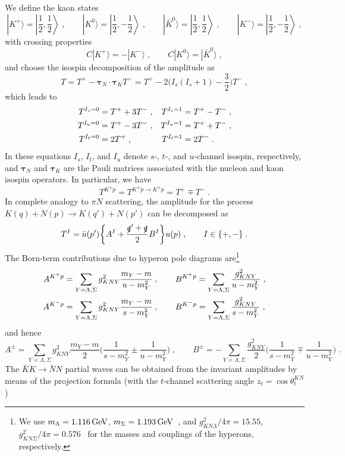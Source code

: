 \documentclass[11pt]{article}%
\providecommand{\ec}{\;,}
\providecommand{\ep}{\;.}
\providecommand{\nt}{\notag}
\newcommand{\beq}{\begin{equation}}
\newcommand{\eeq}{\end{equation}}
\begin{document}
We define the kaon states
\beq
|K^+\rangle=\left|\frac{1}{2},\frac{1}{2}\right\rangle\ec\qquad |K^0\rangle=\left|\frac{1}{2},-\frac{1}{2}\right\rangle\ec \qquad 
|\bar K^0\rangle=\left|\frac{1}{2},\frac{1}{2}\right\rangle\ec\qquad |K^-\rangle=\left|\frac{1}{2},-\frac{1}{2}\right\rangle\ec
\eeq
with crossing properties
\beq
C|K^+\rangle=-|K^-\rangle\ec \qquad C|K^0\rangle=|\bar K^0\rangle\ec
\eeq
and choose the isospin decomposition of the amplitude as
\beq
T=T^+-\boldsymbol{\tau}_N\cdot \boldsymbol{\tau}_K T^-=T^+-2\Big(I_s(I_s+1)-\frac{3}{2}\Big)T^-\ec
\eeq
which leads to
\begin{align}
\label{cJKN}
T^{I_s=0}&=T^++3T^-\ec &T^{I_s=1}&=T^+-T^-\ec\nt\\
T^{I_u=0}&=T^+-3T^-\ec &T^{I_u=1}&=T^++T^-\ec\nt\\
T^{I_t=0}&=2T^+\ec &T^{I_t=1}&=2T^-\ep 
\end{align}
In these equations $I_s$, $I_t$, and $I_u$ denote $s$-, $t$-, and $u$-channel isospin, respectively, and $\boldsymbol{\tau}_N$ and $\boldsymbol{\tau}_K$ are the Pauli matrices associated with the nucleon and kaon isospin operators.
In particular, we have
\beq
T^{K^\pm p}=T^{K^\pm p\to K^\pm p}=T^+\mp T^-\ep
\eeq
In complete analogy to $\pi N$ scattering, the amplitude for the process $K(q)+N(p)\to K(q')+N(p')$ can be decomposed as
\beq
T^I=\bar u (p')\bigg\{A^I+\frac{\slashed q'+\slashed q}{2}B^I\bigg\} u(p)\ec\qquad I\in\{+,-\} \ep
\eeq
The Born-term contributions due to hyperon pole diagrams are\footnote{We use $m_\Lambda=1.116\,{\rm GeV}$, $m_\Sigma=1.193\,{\rm GeV}$~\cite{PDG}, and $g_{KN\Lambda}^2/4\pi=15.55$, $g_{KN\Sigma}^2/4\pi=0.576$~\cite{Speth89} for the masses and couplings of the hyperons, respectively.} 
\begin{align}
A^{K^+p}&=\sum_{Y={\Lambda,\Sigma}}g_{KNY}^2\frac{m_Y-m}{u-m_Y^2}\ec\qquad B^{K^+p}=\sum_{Y={\Lambda,\Sigma}}\frac{g_{KNY}^2}{u-m_Y^2}\ec\nt\\
A^{K^-p}&=\sum_{Y={\Lambda,\Sigma}}g_{KNY}^2\frac{m_Y-m}{s-m_Y^2}\ec\qquad B^{K^-p}=\sum_{Y={\Lambda,\Sigma}}\frac{g_{KNY}^2}{s-m_Y^2}\ec
\end{align}
and hence
\beq
 A^{\pm}=\sum_{Y={\Lambda,\Sigma}}g_{KNY}^2\frac{m_Y-m}{2}\bigg(\frac{1}{s-m_Y^2}\pm\frac{1}{u-m_Y^2}\bigg)\ec\qquad
B^{\pm}=-\sum_{Y={\Lambda,\Sigma}}\frac{g_{KNY}^2}{2}\bigg(\frac{1}{s-m_Y^2}\mp\frac{1}{u-m_Y^2}\bigg)\ep
\eeq
The $\bar K K\to\bar N N$ partial waves can be obtained from the invariant amplitudes by means of the projection formula (with the $t$-channel scattering angle $z_t=\cos\theta_t^{KN}$)
\end{document}
